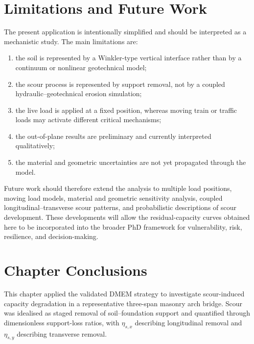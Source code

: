 


\section{Limitations and Future Work}
\label{sec:dmem-scour-limitations}

The present application is intentionally simplified and should be interpreted as a mechanistic study. The main limitations are:

\begin{enumerate}
    \item the soil is represented by a Winkler-type vertical interface rather than by a continuum or nonlinear geotechnical model;
    \item the scour process is represented by support removal, not by a coupled hydraulic--geotechnical erosion simulation;
    \item the live load is applied at a fixed position, whereas moving train or traffic loads may activate different critical mechanisms;
    \item the out-of-plane results are preliminary and currently interpreted qualitatively;
    \item the material and geometric uncertainties are not yet propagated through the model.
\end{enumerate}

Future work should therefore extend the analysis to multiple load positions, moving load models, material and geometric sensitivity analysis, coupled longitudinal--transverse scour patterns, and probabilistic descriptions of scour development. These developments will allow the residual-capacity curves obtained here to be incorporated into the broader PhD framework for vulnerability, risk, resilience, and decision-making.

\section{Chapter Conclusions}
\label{sec:dmem-scour-conclusions}

This chapter applied the validated \gls{DMEM} strategy to investigate scour-induced capacity degradation in a representative three-span masonry arch bridge. Scour was idealised as staged removal of soil--foundation support and quantified through dimensionless support-loss ratios, with $\eta_{s,x}$ describing longitudinal removal and $\eta_{s,y}$ describing transverse removal.

